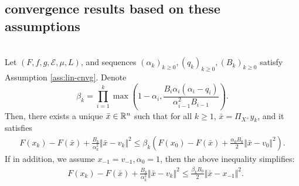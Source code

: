 \documentclass[12pt]{article}
\begin{document}
        \subsection{convergence results based on these assumptions}
            \begin{theorem}\;\label{thm:cnvg-generic-seq}\\
                Let $(F, f, g, \mathcal E, \mu, L)$, and sequences $(\alpha_k)_{k \ge 0}, (q_k)_{k \ge 0}, (B_k)_{k \ge 0}$ 
                satisfy Assumption \ref{ass:lin-cnvg}. 
                Denote 
                $$
                    \beta_k = \prod_{i = 1}^k\max\left(
                        1 - \alpha_i, 
                        \frac{B_i\alpha_i(\alpha_i - q_i)}{\alpha_{i - 1}^2B_{i - 1}}
                    \right). 
                $$
                Then, there exists a unique $\bar x \in \mathbb R^n$ such that for all $k \ge 1$, $\bar x = \Pi_{X^+}y_k$, and it satisfies
                \begin{align*}
                    F(x_k) - F(\bar x) + \frac{B_k}{\alpha_k^2}\Vert \bar x - v_k\Vert^2 
                    \le 
                    \beta_k\left(
                        F(x_0) - F(\bar x) + \frac{\alpha_0B_0}{2}\Vert \bar x - v_0\Vert^2
                    \right). 
                \end{align*}
                If in addition, we assume $x_{-1} = v_{-1}, \alpha_0 = 1$, then the above inequality simplifies: 
                \begin{align*}
                    & F(x_k) - F(\bar x) + \frac{B_k}{\alpha_k^2}\Vert \bar x - v_k\Vert^2 \le 
                    \frac{\beta_kB_0}{2}\Vert \bar x - x_{-1}\Vert^2.
                \end{align*}
            \end{theorem}
\end{document}
